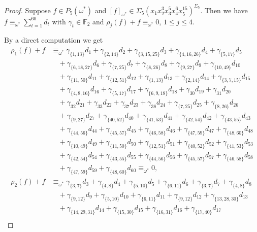 \documentclass[reqno]{amsart}
\theoremstyle{plain}
\theoremstyle{definition}
\theoremstyle{plain}
\theoremstyle{definition}
\numberwithin{equation}{section}
\begin{document}
\begin{proof}
Suppose $f \in P_5(\omega^*)$ and $[f]_{\omega^*} \in  \Sigma_5(x_1x_2^3x_3^5x_4^6x_5^{15})^{\Sigma_5}$. Then we have
$f \equiv_{\omega^*} \sum_{t=1}^{60}d_t$ with $\gamma_t \in \mathbb F_2$ and $\rho_j(f)+f \equiv_{\omega^*} 0$, $1 \leqslant j \leqslant 4$. 

By a direct computation we get
\begin{align*}
\rho_1(f) + f &\equiv_{\omega^*} \gamma_{\{1,13\}}d_{1} + \gamma_{\{2,14\}}d_{2} + \gamma_{\{3,15,25\}}d_{3} + \gamma_{\{4,16,26\}}d_{4} + \gamma_{\{5,17\}}d_{5}\\ 
&\quad + \gamma_{\{6,18,27\}}d_{6} + \gamma_{\{7,25\}}d_{7} + \gamma_{\{8,26\}}d_{8} + \gamma_{\{9,27\}}d_{9} + \gamma_{\{10,49\}}d_{10}\\ 
&\quad + \gamma_{\{11,50\}}d_{11} + \gamma_{\{12,51\}}d_{12} + \gamma_{\{1,13\}}d_{13} + \gamma_{\{2,14\}}d_{14} + \gamma_{\{3,7,15\}}d_{15}\\ 
&\quad + \gamma_{\{4,8,16\}}d_{16} + \gamma_{\{5,17\}}d_{17} + \gamma_{\{6,9,18\}}d_{18} + \gamma_{30}d_{19} + \gamma_{31}d_{20}\\ 
&\quad + \gamma_{32}d_{21} + \gamma_{33}d_{22} + \gamma_{37}d_{23} + \gamma_{38}d_{24} + \gamma_{\{7,25\}}d_{25} + \gamma_{\{8,26\}}d_{26}\\ 
&\quad + \gamma_{\{9,27\}}d_{27} + \gamma_{\{40,52\}}d_{40} + \gamma_{\{41,53\}}d_{41} + \gamma_{\{42,54\}}d_{42} + \gamma_{\{43,55\}}d_{43}\\ 
&\quad + \gamma_{\{44,56\}}d_{44} + \gamma_{\{45,57\}}d_{45} + \gamma_{\{46,58\}}d_{46} + \gamma_{\{47,59\}}d_{47} + \gamma_{\{48,60\}}d_{48}\\ 
&\quad + \gamma_{\{10,49\}}d_{49} + \gamma_{\{11,50\}}d_{50} + \gamma_{\{12,51\}}d_{51} + \gamma_{\{40,52\}}d_{52} + \gamma_{\{41,53\}}d_{53}\\ 
&\quad + \gamma_{\{42,54\}}d_{54} + \gamma_{\{43,55\}}d_{55} + \gamma_{\{44,56\}}d_{56} + \gamma_{\{45,57\}}d_{57} + \gamma_{\{46,58\}}d_{58}\\ 
&\quad + \gamma_{\{47,59\}}d_{59} + \gamma_{\{48,60\}}d_{60}  \equiv_{\omega^*} 0,\\
\rho_2(f) + f &\equiv_{\omega^*} \gamma_{\{3,7\}}d_{3} + \gamma_{\{4,8\}}d_{4} + \gamma_{\{5,10\}}d_{5} + \gamma_{\{6,11\}}d_{6} + \gamma_{\{3,7\}}d_{7} + \gamma_{\{4,8\}}d_{8}\\ 
&\quad + \gamma_{\{9,12\}}d_{9} + \gamma_{\{5,10\}}d_{10} + \gamma_{\{6,11\}}d_{11} + \gamma_{\{9,12\}}d_{12} + \gamma_{\{13,28,30\}}d_{13}\\ 
&\quad + \gamma_{\{14,29,31\}}d_{14} + \gamma_{\{15,30\}}d_{15} + \gamma_{\{16,31\}}d_{16} + \gamma_{\{17,40\}}d_{17}\\ 

\end{align*}
\end{proof}
\end{document}
